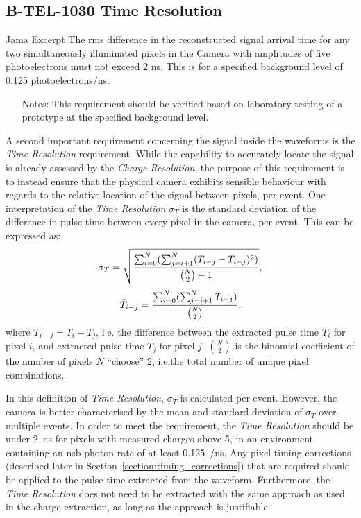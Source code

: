 \subsection{B-TEL-1030 Time Resolution} \label{section:time_res}

\begin{requirement}{Jama Excerpt} 
The rms difference in the reconstructed signal arrival time for any two simultaneously illuminated pixels in the Camera with amplitudes of five photoelectrons must not exceed 2 ns. This is for a specified background level of 0.125 photoelectrons/ns.

\begin{itemize}
\item [Notes:] This requirement should be verified based on laboratory testing of a prototype at the specified background level.
\end{itemize}
\end{requirement}

A second important requirement concerning the signal inside the waveforms is the \textit{Time Resolution} requirement. While the capability to accurately locate the signal is already assessed by the \textit{Charge Resolution}, the purpose of this requirement is to instead ensure that the physical camera exhibits sensible behaviour with regards to the relative location of the signal between pixels, per event. One interpretation of the \textit{Time Resolution} $\sigma_T$ is the standard deviation of the difference in pulse time between every pixel in the camera, per event. This can be expressed as:
\begin{equation} \label{eq:time_res}
\sigma_T = \sqrt{\frac{\sum_{i=0}^N(\sum_{j=i+1}^N (T_{i-j} - \bar{T}_{i-j})^2)}{\binom{N}{2} - 1}},
\end{equation}
\begin{equation} \label{eq:time_res2}
\bar{T}_{i-j} = \frac{\sum_{i=0}^N(\sum_{j=i+1}^N T_{i-j})}{\binom{N}{2}},
\end{equation}
where $T_{i-j} = T_i - T_j$, i.e. the difference between the extracted pulse time $T_i$ for pixel $i$, and extracted pulse time $T_j$ for pixel $j$. $\binom{N}{2}$ is the binomial coefficient of the number of pixels $N$ ``choose'' 2, i.e.\@ the total number of unique pixel combinations.

In this definition of \textit{Time Resolution}, $\sigma_T$ is calculated per event. However, the camera is better characterised by the mean and standard deviation of $\sigma_T$ over multiple events. In order to meet the requirement, the \textit{Time Resolution} should be under \SI{2}{ns} for pixels with measured charges above \SI{5}{\pe}, in an environment containing an \gls{nsb} photon rate of at least \SI{0.125}{\pe/ns}. Any pixel timing corrections (described later in Section~\ref{section:timing_corrections}) that are required should be applied to the pulse time extracted from the waveform. Furthermore, the \textit{Time Resolution} does not need to be extracted with the same approach as used in the charge extraction, as long as the approach is justifiable.

